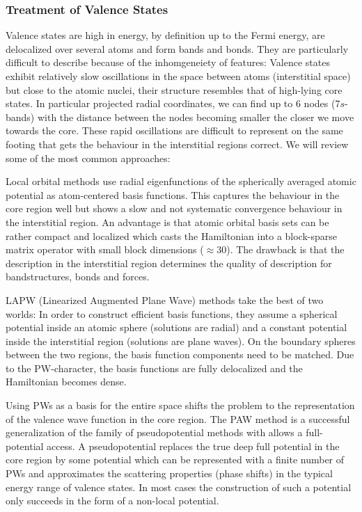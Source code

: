 \documentclass[oribibl]{llncs}
\begin{document}
\subsubsection{Treatment of Valence States} \label{sec:valence-states}
%
Valence states are high in energy, by definition up to the Fermi
energy, are delocalized over several atoms and form bands and bonds.
They are particularly difficult to describe because of the 
inhomgeneiety of features:
Valence states exhibit relatively slow oscillations 
in the space between atoms (interstitial space) but close to the atomic nuclei,
their structure resembles that of high-lying core states.
In particular projected radial coordinates, we can find up to $6$ nodes
(7$s$-bands) with the distance between the nodes becoming smaller
the closer we move towards the core.
These rapid oscillations are difficult to represent
on the same footing that gets the behaviour in the interstitial regions correct. 
We will review some of the most common approaches:

Local orbital methods use radial eigenfunctions 
of the spherically averaged atomic potential as atom-centered basis functions.
This captures the behaviour in the core region well
but shows a slow and not systematic convergence behaviour in the interstitial region. 
An advantage is that atomic orbital basis sets can be rather compact
and localized which casts the Hamiltonian into a block-sparse matrix operator with small block dimensions ($\approx 30$).
The drawback is that the description in the interstitial region determines the
quality of description for bandstructures, bonds and forces.

LAPW (Linearized Augmented Plane Wave) methods take the best of two worlds:
In order to construct efficient basis functions, 
they assume a spherical potential inside an atomic sphere (solutions are radial)
and a constant potential inside the interstitial region (solutions are plane waves). 
On the boundary spheres between the two regions, the basis function components need to be matched.
Due to the \ac{PW}-character, the basis functions are fully delocalized and 
the Hamiltonian becomes dense.

Using \ac{PW}s as a basis for the entire space shifts the problem to the representation of the valence wave function in the core region.
The \ac{PAW} method is a successful generalization of the family of pseudopotential methods with allows a full-potential access.
A pseudopotential replaces the true deep full potential in the core region
by some potential which can be represented with a finite number of \ac{PW}s
and approximates the scattering properties (phase shifts) in the typical energy
range of valence states.
In most cases the construction of such a potential only succeeds in the form of
a non-local potential.
\end{document}
